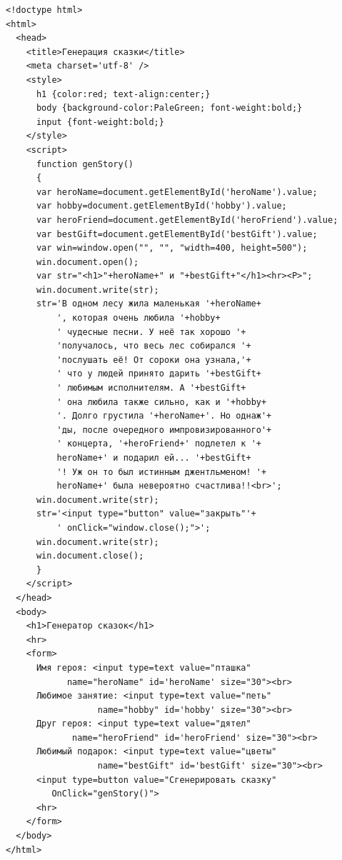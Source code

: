 \begin{verbatim}
<!doctype html>
<html>
  <head>
    <title>Генерация сказки</title>
    <meta charset='utf-8' />
    <style>
      h1 {color:red; text-align:center;}
      body {background-color:PaleGreen; font-weight:bold;}
      input {font-weight:bold;}
    </style>
    <script>
      function genStory()
      {
	  var heroName=document.getElementById('heroName').value;
	  var hobby=document.getElementById('hobby').value;
	  var heroFriend=document.getElementById('heroFriend').value;
	  var bestGift=document.getElementById('bestGift').value;
	  var win=window.open("", "", "width=400, height=500");
	  win.document.open();
	  var str="<h1>"+heroName+" и "+bestGift+"</h1><hr><P>";
	  win.document.write(str);
	  str='В одном лесу жила маленькая '+heroName+
	      ', которая очень любила '+hobby+
	      ' чудесные песни. У неё так хорошо '+
	      'получалось, что весь лес собирался '+
	      'послушать её! От сороки она узнала,'+
	      ' что у людей принято дарить '+bestGift+
	      ' любимым исполнителям. А '+bestGift+
	      ' она любила также сильно, как и '+hobby+
	      '. Долго грустила '+heroName+'. Но однаж'+
	      'ды, после очередного импровизированного'+
	      ' концерта, '+heroFriend+' подлетел к '+
	      heroName+' и подарил ей... '+bestGift+
	      '! Уж он то был истинным джентльменом! '+
	      heroName+' была невероятно счастлива!!<br>';
	  win.document.write(str);
	  str='<input type="button" value="закрыть"'+
	      ' onClick="window.close();">';
	  win.document.write(str);
	  win.document.close();
      }
    </script>
  </head>
  <body>
    <h1>Генератор сказок</h1>
    <hr>
    <form>
      Имя героя: <input type=text value="пташка"
			name="heroName" id='heroName' size="30"><br>
      Любимое занятие: <input type=text value="петь"
			      name="hobby" id='hobby' size="30"><br>
      Друг героя: <input type=text value="дятел"
			 name="heroFriend" id='heroFriend' size="30"><br>
      Любимый подарок: <input type=text value="цветы"
			      name="bestGift" id='bestGift' size="30"><br>
      <input type=button value="Сгенерировать сказку"
	     OnClick="genStory()">
      <hr>
    </form>
  </body>
</html>
\end{verbatim}
